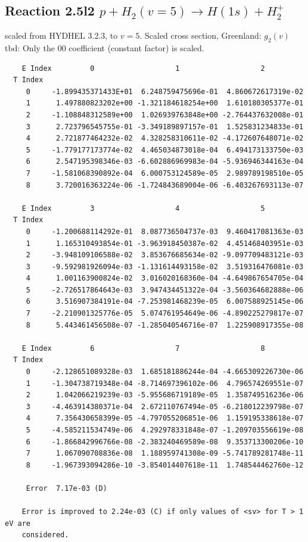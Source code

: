 \documentclass[12pt,dvipdfmx]{article}
\begin{document}
\subsection{
Reaction 2.5l2 $   p + H_2(v=5) \rightarrow H(1s) + H_2^+$}
scaled from HYDHEL 3.2.3, to $v=5$. Scaled cross section, Greenland: $g_2(v)$
tbd:
Only the 00 coefficient (constant factor) is scaled.


\begin{small}\begin{verbatim}
    E Index         0                   1                   2
  T Index
     0     -1.899435371433E+01  6.248759475696e-01  4.860672617319e-02
     1      1.497880823202e+00 -1.321184618254e+00  1.610180305377e-01
     2     -1.108848312589e+00  1.026939763848e+00 -2.764437632008e-01
     3      2.723796545755e-01 -3.349189897157e-01  1.525831234833e-01
     4      2.721877464232e-02  4.328258310611e-02 -4.172607648071e-02
     5     -1.779177173774e-02  4.465034873018e-04  6.494173133750e-03
     6      2.547195398346e-03 -6.602886969983e-04 -5.936946344163e-04
     7     -1.581068390892e-04  6.000753124589e-05  2.989789198510e-05
     8      3.720016363224e-06 -1.724843689004e-06 -6.403267693113e-07

    E Index         3                   4                   5
  T Index
     0     -1.200688114292e-01  8.087736504737e-03  9.460417081363e-03
     1      1.165310493854e-01 -3.963918450387e-02  4.451468403951e-03
     2     -3.948109106588e-02  3.853676685634e-02 -9.097709483121e-03
     3     -9.592981926094e-03 -1.131614493158e-02  3.519316476081e-03
     4      1.001163900824e-02  3.016020168360e-04 -4.649867654705e-04
     5     -2.726517864643e-03  3.947434451322e-04 -3.560364682888e-06
     6      3.516907384191e-04 -7.253981468239e-05  6.007588925145e-06
     7     -2.210901325776e-05  5.074761954649e-06 -4.890225279817e-07
     8      5.443461456508e-07 -1.285040546716e-07  1.225908917355e-08

    E Index         6                   7                   8
  T Index
     0     -2.128651089328e-03  1.685181886244e-04 -4.665309226730e-06
     1     -1.304738719348e-04 -8.714697396102e-06  4.796574269551e-07
     2      1.042066219239e-03 -5.955686719189e-05  1.358749516236e-06
     3     -4.463914380371e-04  2.672110767494e-05 -6.218012239798e-07
     4      7.356430658399e-05 -4.797055206851e-06  1.159195338618e-07
     5     -4.585211534749e-06  4.292978331848e-07 -1.209703556619e-08
     6     -1.866842996766e-08 -2.383240469589e-08  9.353713300206e-10
     7      1.067090708836e-08  1.188959741308e-09 -5.741789281748e-11
     8     -1.967393094286e-10 -3.854014407618e-11  1.748544462760e-12

     Error  7.17e-03 (D)

    Error is improved to 2.24e-03 (C) if only values of <sv> for T > 1 eV are
    considered.
\end{verbatim}\end{small}
\newpage
\end{document}
